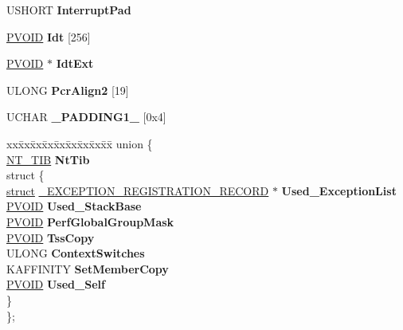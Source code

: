 \begin{DoxyCompactItemize}
\begin{tabbing}
\end{tabbing}\item 
\mbox{\label{struct___k_i_p_c_r_a12b87b5b41b7ad6114b66496f110bba5}} 
U\+S\+H\+O\+RT {\bfseries Interrupt\+Pad}
\item 
\mbox{\label{struct___k_i_p_c_r_a1d52a95ed35b686d26e64dbafc609ab2}} 
\hyperlink{interfacevoid}{P\+V\+O\+ID} {\bfseries Idt} \mbox{[}256\mbox{]}
\item 
\mbox{\label{struct___k_i_p_c_r_a879a23d8b24a018c7d84c735cf483566}} 
\hyperlink{interfacevoid}{P\+V\+O\+ID} $\ast$ {\bfseries Idt\+Ext}
\item 
\mbox{\label{struct___k_i_p_c_r_a900cfeeb6ae979da6ae6e9c0f73362cc}} 
U\+L\+O\+NG {\bfseries Pcr\+Align2} \mbox{[}19\mbox{]}
\item 
\mbox{\label{struct___k_i_p_c_r_aeaaca1c319134eb29dae7b7a746ee556}} 
U\+C\+H\+AR {\bfseries \+\_\+\+P\+A\+D\+D\+I\+N\+G1\+\_\+} \mbox{[}0x4\mbox{]}
\item 
\mbox{\label{struct___k_i_p_c_r_a5027d11fc905b1b00daa1492c6efda34}} 
\begin{tabbing}
xx\=xx\=xx\=xx\=xx\=xx\=xx\=xx\=xx\=\kill
union \{\\
\>\hyperlink{struct___n_t___t_i_b}{NT\_TIB} {\bfseries NtTib}\\
\mbox{\label{union___k_i_p_c_r_1_1_0D2035_a9ffe2b050a486671b7d0cb45608c6fce}} 
\>struct \{\\
\>\>\hyperlink{interfacestruct}{struct} \hyperlink{struct___e_x_c_e_p_t_i_o_n___r_e_g_i_s_t_r_a_t_i_o_n___r_e_c_o_r_d}{\_EXCEPTION\_REGISTRATION\_RECORD} $\ast$ {\bfseries Used\_ExceptionList}\\
\>\>\hyperlink{interfacevoid}{PVOID} {\bfseries Used\_StackBase}\\
\>\>\hyperlink{interfacevoid}{PVOID} {\bfseries PerfGlobalGroupMask}\\
\>\>\hyperlink{interfacevoid}{PVOID} {\bfseries TssCopy}\\
\>\>ULONG {\bfseries ContextSwitches}\\
\>\>KAFFINITY {\bfseries SetMemberCopy}\\
\>\>\hyperlink{interfacevoid}{PVOID} {\bfseries Used\_Self}\\
\>\} \\
\}; \\


\end{tabbing}
\end{DoxyCompactItemize}
